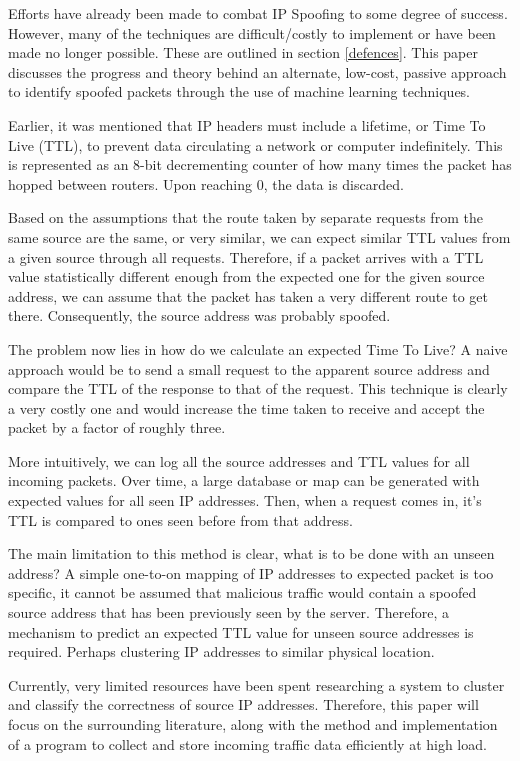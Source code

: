 \documentclass[twocolumn,10pt]{asme2ej}
\begin{document}
Efforts have already been made to combat IP Spoofing to some degree of success. However, many of the techniques are difficult/costly to implement or have been made no longer possible. These are outlined in section \ref{defences}. This paper discusses the progress and theory behind an alternate, low-cost, passive approach to identify spoofed packets through the use of machine learning techniques. 

Earlier, it was mentioned that IP headers must include a lifetime, or Time To Live (TTL), to prevent data circulating a network or computer indefinitely. This is represented as an 8-bit decrementing counter of how many times the packet has hopped between routers. Upon reaching 0, the data is discarded.

Based on the assumptions that the route taken by separate requests from the same source are the same, or very similar, we can expect similar TTL values from a given source through all requests. Therefore, if a packet arrives with a TTL value statistically different enough from the expected one for the given source address, we can assume that the packet has taken a very different route to get there. Consequently, the source address was probably spoofed.

The problem now lies in how do we calculate an expected Time To Live? A naive approach would be to send a small request to the apparent source address and compare the TTL of the response to that of the request. This technique is clearly a very costly one and would increase the time taken to receive and accept the packet by a factor of roughly three. 

More intuitively, we can log all the source addresses and TTL values for all incoming packets. Over time, a large database or map can be generated with expected values for all seen IP addresses. Then, when a request comes in, it's TTL is compared to ones seen before from that address.

The main limitation to this method is clear, what is to be done with an unseen address? A simple one-to-on mapping of IP addresses to expected packet is too specific, it cannot be assumed that malicious traffic would contain a spoofed source address that has been previously seen by the server. Therefore, a mechanism to predict an expected TTL value for unseen source addresses is required. Perhaps clustering IP addresses to similar physical location.

Currently, very limited resources have been spent researching a system to cluster and classify the correctness of source IP addresses. Therefore, this paper will focus on the surrounding literature, along with the method and implementation of a program to collect and store incoming traffic data efficiently at high load.
\end{document}
